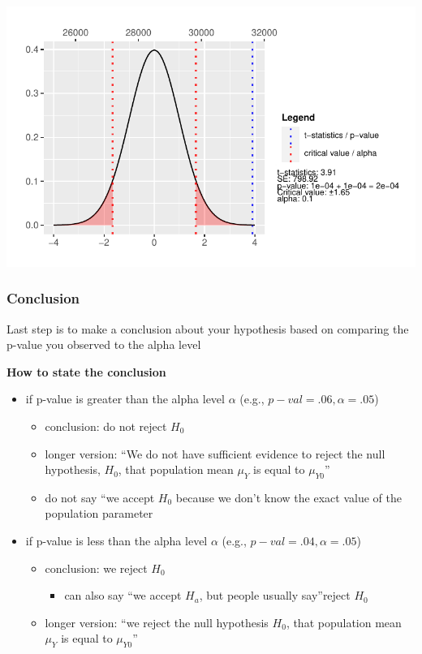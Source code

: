 \documentclass[
  letterpaper,
  DIV=11,
  numbers=noendperiod]{scrartcl}
\providecommand{\tightlist}{%
  \setlength{\itemsep}{0pt}\setlength{\parskip}{0pt}}\usepackage{longtable,booktabs,array}
\begin{document}
\includegraphics{SSS_5.1-Lecture_files/figure-pdf/unnamed-chunk-14-1.pdf}

\subsubsection{Conclusion}\label{conclusion}

Last step is to make a conclusion about your hypothesis based on
comparing the p-value you observed to the alpha level

\textbf{How to state the conclusion}

\begin{itemize}
\tightlist
\item
  if p-value is greater than the alpha level \(\alpha\) (e.g.,
  \(p-val =.06, \alpha = .05\))

  \begin{itemize}
  \tightlist
  \item
    conclusion: do not reject \(H_0\)
  \item
    longer version: ``We do not have sufficient evidence to reject the
    null hypothesis, \(H_0\), that population mean \(\mu_Y\) is equal to
    \(\mu_{Y0}\)''
  \item
    do not say ``we accept \(H_0\) because we don't know the exact value
    of the population parameter
  \end{itemize}
\item
  if p-value is less than the alpha level \(\alpha\) (e.g.,
  \(p-val =.04, \alpha = .05\))

  \begin{itemize}
  \tightlist
  \item
    conclusion: we reject \(H_0\)

    \begin{itemize}
    \tightlist
    \item
      can also say ``we accept \(H_a\), but people usually say''reject
      \(H_0\)
    \end{itemize}
  \item
    longer version: ``we reject the null hypothesis \(H_0\), that
    population mean \(\mu_Y\) is equal to \(\mu_{Y0}\)''
  \end{itemize}
\end{itemize}
\end{document}

